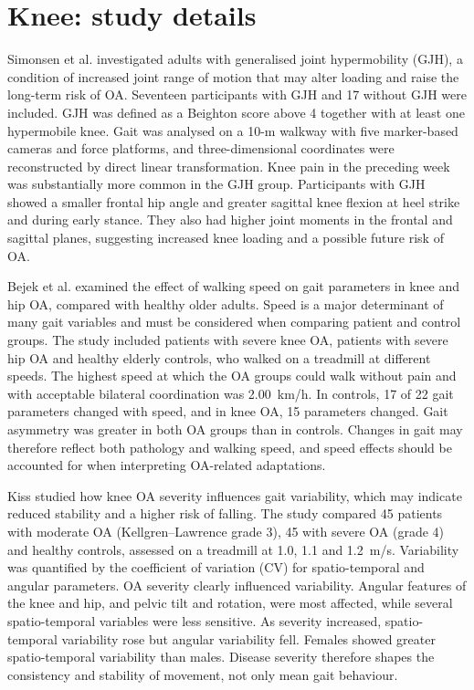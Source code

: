 \documentclass[12pt]{elsarticle}
\begin{document}
\section{Knee: study details}
\label{supp:S2}
Simonsen et al. \cite{simonsen2012gait} investigated adults with { generalised} joint hypermobility (GJH), a condition { of} increased joint range of motion { that} may alter loading and { raise} the long-term risk of { OA. Seventeen} participants with GJH and 17 without { GJH were included. GJH was defined as} a Beighton score { above} 4 together with at least one hypermobile knee. Gait was analysed on a { 10-m walkway with} five marker-based cameras and force platforms, { and three-dimensional coordinates were reconstructed by} direct linear transformation. { Knee pain in} the preceding week was substantially more common in the GJH group. { Participants with GJH showed} a smaller frontal hip angle and greater { sagittal} knee flexion at heel strike and during early stance. { They also had} higher joint moments in the frontal and sagittal planes, suggesting increased knee loading and a possible { future risk of OA.}

Bejek et al. \cite{bejek2006influence} examined the effect of walking speed on gait parameters in knee and hip { OA,} compared with healthy older adults. { Speed} is a major determinant of many gait variables and must be considered when comparing patient and control groups. The study included patients with severe knee OA, patients with severe hip { OA} and healthy elderly { controls, who walked on a treadmill at different speeds. The} highest speed at which the OA groups could walk without pain and with acceptable bilateral { coordination was 2.00~km/h. In controls,} 17 of 22 gait parameters changed with speed, { and in knee OA, 15 parameters changed.} Gait asymmetry was greater in both OA groups than in controls. { Changes} in gait may { therefore} reflect both pathology and walking speed, and speed effects should be accounted for when interpreting OA-related adaptations.

Kiss \cite{kiss2011effect} { studied} how knee OA { severity} influences gait variability, { which} may indicate reduced stability and a higher risk of falling. The study compared 45 patients with moderate OA (Kellgren--Lawrence grade 3), 45 with severe OA (grade { 4) and healthy controls,} assessed on a treadmill at 1.0, { 1.1} and 1.2~m/s. Variability was quantified { by} the coefficient of variation (CV) for spatio-temporal and angular parameters. { OA severity clearly influenced variability.} Angular features of the knee and hip, { and} pelvic tilt and rotation, were { most affected, while} several spatio-temporal variables were less sensitive. { As severity increased, spatio-temporal variability rose but angular variability fell. Females showed} greater spatio-temporal variability than males. { Disease severity therefore} shapes the consistency and stability of { movement, not only mean gait behaviour.}
\end{document}

